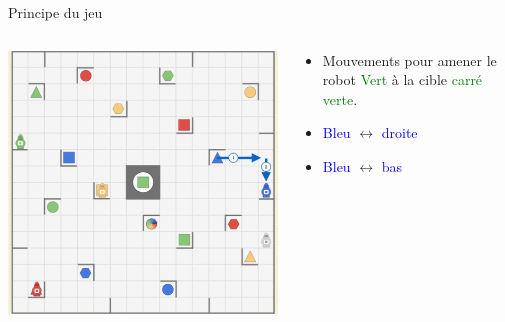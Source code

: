 \documentclass{beamer}
\begin{document}
\begin{frame}{Principe du jeu}
    \begin{columns}
        \begin{column}{0.6\textwidth}
        \vspace{\topsep}
        \includegraphics[scale=0.4]{Images/r4.png}%
        \end{column}
        
        \begin{column}{0.4\textwidth}
        \begin{itemize}
        \item Mouvements pour amener le robot \textcolor{green}{Vert} à la cible \textcolor{green}{carré verte}.
        \item \textcolor{blue}{Bleu} $\longleftrightarrow$ \textcolor{blue}{droite}
        \item \textcolor{blue}{Bleu} $\longleftrightarrow$ \textcolor{blue}{bas}
        \end{itemize}
        \end{column}
    \end{columns}
\end{frame}
\end{document}

